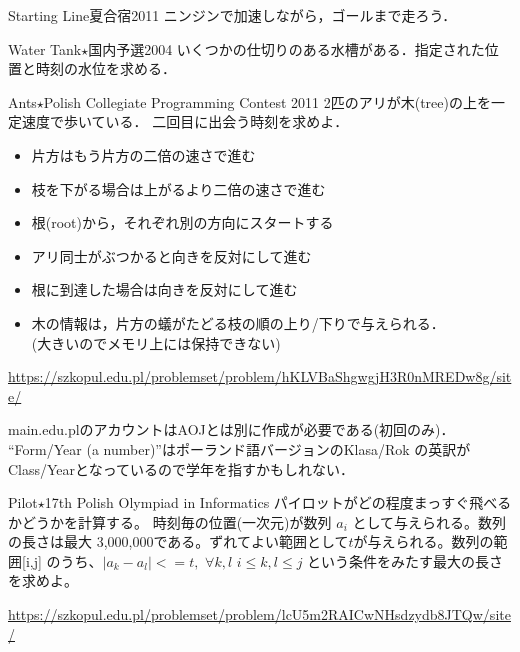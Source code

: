 \begin{pbox}{Starting Line}{夏合宿2011}
  ニンジンで加速しながら，ゴールまで走ろう．

\end{pbox}

\begin{pbox}{Water Tank$\star$}{国内予選2004}
いくつかの仕切りのある水槽がある．指定された位置と時刻の水位を求める．

\end{pbox}

\begin{pbox}{Ants$\star$}{Polish Collegiate Programming Contest 2011}
2匹のアリが木(tree)の上を一定速度で歩いている．
二回目に出会う時刻を求めよ．

\begin{itemize}
\setlength{\itemsep}{0pt}
\item 片方はもう片方の二倍の速さで進む
\item 枝を下がる場合は上がるより二倍の速さで進む
\item 根(root)から，それぞれ別の方向にスタートする
\item アリ同士がぶつかると向きを反対にして進む
\item 根に到達した場合は向きを反対にして進む
\item 木の情報は，片方の蟻がたどる枝の順の上り/下りで与えられる．\\(大きいのでメモリ上には保持できない)
\end{itemize}

\url{https://szkopul.edu.pl/problemset/problem/hKLVBaShgwgjH3R0nMREDw8g/site/}
\end{pbox}

main.edu.plのアカウントはAOJとは別に作成が必要である(初回のみ)．
``Form/Year (a number)''はポーランド語バージョンのKlasa/Rok の英訳が
Class/Yearとなっているので学年を指すかもしれない．


\begin{pbox}{Pilot$\star$}{17th Polish Olympiad in Informatics}
パイロットがどの程度まっすぐ飛べるかどうかを計算する。
時刻毎の位置(一次元)が数列 $a_i$ として与えられる。数列の長さは最大
3,000,000である。ずれてよい範囲として$t$が与えられる。数列の範囲[i,j]
のうち、$|a_k-a_l|<=t,\,\,\forall k,l\,\, i\le k,l \le j$ という条件をみたす最大の長さを求めよ。

\url{https://szkopul.edu.pl/problemset/problem/lcU5m2RAICwNHsdzydb8JTQw/site/}
\end{pbox}

